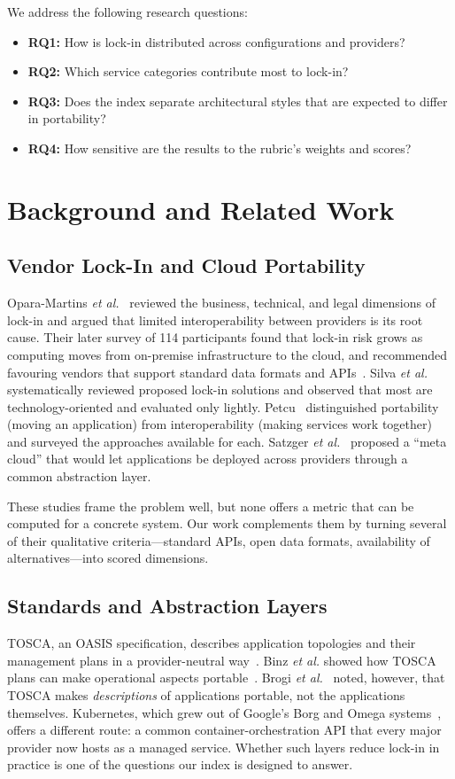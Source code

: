 \documentclass[conference]{IEEEtran}
\begin{document}
We address the following research questions:
\begin{itemize}
\item \textbf{RQ1:} How is lock-in distributed across configurations and providers?
\item \textbf{RQ2:} Which service categories contribute most to lock-in?
\item \textbf{RQ3:} Does the index separate architectural styles that are expected to differ in portability?
\item \textbf{RQ4:} How sensitive are the results to the rubric's weights and scores?
\end{itemize}

\section{Background and Related Work}
\label{sec:related}

\subsection{Vendor Lock-In and Cloud Portability}
Opara-Martins \textit{et al.}~\cite{opara2014} reviewed the business, technical, and legal dimensions of lock-in and argued that limited interoperability between providers is its root cause. Their later survey of 114 participants found that lock-in risk grows as computing moves from on-premise infrastructure to the cloud, and recommended favouring vendors that support standard data formats and APIs~\cite{opara2016}. Silva \textit{et al.}~\cite{silva2013} systematically reviewed proposed lock-in solutions and observed that most are technology-oriented and evaluated only lightly. Petcu~\cite{petcu2011} distinguished portability (moving an application) from interoperability (making services work together) and surveyed the approaches available for each. Satzger \textit{et al.}~\cite{satzger2013} proposed a ``meta cloud'' that would let applications be deployed across providers through a common abstraction layer.

These studies frame the problem well, but none offers a metric that can be computed for a concrete system. Our work complements them by turning several of their qualitative criteria---standard APIs, open data formats, availability of alternatives---into scored dimensions.

\subsection{Standards and Abstraction Layers}
TOSCA, an OASIS specification, describes application topologies and their management plans in a provider-neutral way~\cite{tosca}. Binz \textit{et al.} showed how TOSCA plans can make operational aspects portable~\cite{binz2012,binz2014}. Brogi \textit{et al.}~\cite{brogi2014} noted, however, that TOSCA makes \emph{descriptions} of applications portable, not the applications themselves. Kubernetes, which grew out of Google's Borg and Omega systems~\cite{burns2016}, offers a different route: a common container-orchestration API that every major provider now hosts as a managed service. Whether such layers reduce lock-in in practice is one of the questions our index is designed to answer.
\end{document}

